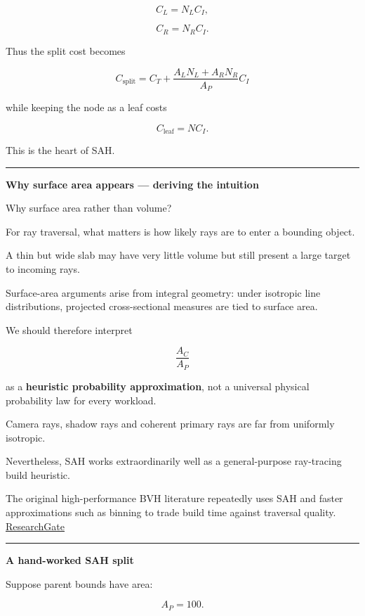 \[
C_L=N_LC_I,
\]

\[
C_R=N_RC_I.
\]

Thus the split cost becomes

\[
\boxed{
C_{\text{split}}
=
C_T+
\frac{
A_LN_L+A_RN_R
}{
A_P
}
C_I
}
\]

while keeping the node as a leaf costs

\[
\boxed{
C_{\text{leaf}}=NC_I.
}
\]

This is the heart of SAH.

\begin{center}\rule{0.5\linewidth}{0.5pt}\end{center}

\textbf{Why surface area appears --- deriving the intuition}

Why surface area rather than volume?

For ray traversal, what matters is how likely rays are to enter a bounding object.

A thin but wide slab may have very little volume but still present a large target to incoming rays.

Surface-area arguments arise from integral geometry: under isotropic line distributions, projected cross-sectional measures are tied to surface area.

We should therefore interpret

\[
\frac{A_C}{A_P}
\]

as a \textbf{heuristic probability approximation}, not a universal physical probability law for every workload.

Camera rays, shadow rays and coherent primary rays are far from uniformly isotropic.

Nevertheless, SAH works extraordinarily well as a general-purpose ray-tracing build heuristic.

The original high-performance BVH literature repeatedly uses SAH and faster approximations such as binning to trade build time against traversal quality. \href{https://www.researchgate.net/publication/4278645_On_Fast_Construction_of_SAH_based_Bounding_Volume_Hierarchies?utm_source=chatgpt.com}{ResearchGate}

\begin{center}\rule{0.5\linewidth}{0.5pt}\end{center}

\textbf{A hand-worked SAH split}

Suppose parent bounds have area:

\[
A_P=100.
\]

